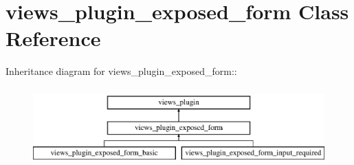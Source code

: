 \hypertarget{classviews__plugin__exposed__form}{
\section{views\_\-plugin\_\-exposed\_\-form Class Reference}
\label{classviews__plugin__exposed__form}
}
Inheritance diagram for views\_\-plugin\_\-exposed\_\-form::\begin{figure}[H]
\begin{center}
\leavevmode
\includegraphics[height=3cm]{classviews__plugin__exposed__form}
\end{center}
\end{figure}
